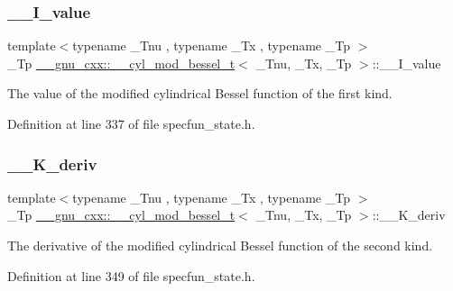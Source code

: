 \subsubsection{\texorpdfstring{\+\_\+\+\_\+\+I\+\_\+value}{\_\_I\_value}}
{\footnotesize\ttfamily template$<$typename \+\_\+\+Tnu , typename \+\_\+\+Tx , typename \+\_\+\+Tp $>$ \\
\+\_\+\+Tp \hyperlink{struct____gnu__cxx_1_1____cyl__mod__bessel__t}{\+\_\+\+\_\+gnu\+\_\+cxx\+::\+\_\+\+\_\+cyl\+\_\+mod\+\_\+bessel\+\_\+t}$<$ \+\_\+\+Tnu, \+\_\+\+Tx, \+\_\+\+Tp $>$\+::\+\_\+\+\_\+\+I\+\_\+value}



The value of the modified cylindrical Bessel function of the first kind. 



Definition at line 337 of file specfun\+\_\+state.\+h.

\mbox{\label{struct____gnu__cxx_1_1____cyl__mod__bessel__t_a8f86a11fb265db76743d80e98be389be}} 
\subsubsection{\texorpdfstring{\+\_\+\+\_\+\+K\+\_\+deriv}{\_\_K\_deriv}}
{\footnotesize\ttfamily template$<$typename \+\_\+\+Tnu , typename \+\_\+\+Tx , typename \+\_\+\+Tp $>$ \\
\+\_\+\+Tp \hyperlink{struct____gnu__cxx_1_1____cyl__mod__bessel__t}{\+\_\+\+\_\+gnu\+\_\+cxx\+::\+\_\+\+\_\+cyl\+\_\+mod\+\_\+bessel\+\_\+t}$<$ \+\_\+\+Tnu, \+\_\+\+Tx, \+\_\+\+Tp $>$\+::\+\_\+\+\_\+\+K\+\_\+deriv}



The derivative of the modified cylindrical Bessel function of the second kind. 



Definition at line 349 of file specfun\+\_\+state.\+h.

\mbox{\label{struct____gnu__cxx_1_1____cyl__mod__bessel__t_a481e4c4537583c461654405c01c25566}} 
